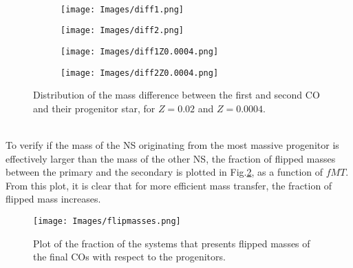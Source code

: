 \documentclass[preprint,12pt]{elsarticle}
\begin{document}
\\
\begin{figure}[ht]  
    \centering
    \begin{subfigure}[t]{0.45\textwidth}
        \centering
        \texttt{[image: Images/diff1.png]}
    \end{subfigure}
    \begin{subfigure}[t]{0.45\textwidth}
        \centering  
        \texttt{[image: Images/diff2.png]}
    \end{subfigure}
    \begin{subfigure}[t]{0.45\textwidth}
        \centering  
        \texttt{[image: Images/diff1Z0.0004.png]}
    \end{subfigure}
    \begin{subfigure}[t]{0.45\textwidth}
        \centering  
        \texttt{[image: Images/diff2Z0.0004.png]}
    \end{subfigure}
    \caption{Distribution of the mass difference between the first and second CO and their progenitor star, for $Z=0.02$ and $Z=0.0004$.}
    \label{img:diff1}
 \end{figure}
 \\
 
To verify if the mass of the NS originating from the most massive progenitor is effectively larger than the mass of the other NS, the fraction of flipped masses between the primary and the secondary is plotted in Fig.\ref{img:flipmasses}, as a  function of $fMT$. From this plot, it is clear that for more efficient mass transfer, the fraction of flipped mass increases.
\begin{figure}[h!!]
    \centering
    \texttt{[image: Images/flipmasses.png]}
    \caption{Plot of the fraction of the systems that presents flipped masses of the final COs with respect to the progenitors.}
    \label{img:flipmasses}
\end{figure}
\end{document}
